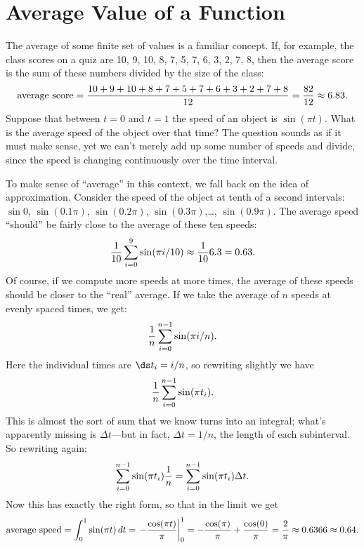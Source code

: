 \section{Average Value of a Function}{}{}\label{sec:Average Value}
The average of some finite set of values is a familiar concept. If,
for example, the class scores on a quiz are 10, 9, 10, 8, 7, 5, 7, 6,
3, 2, 7, 8, then the average score is the sum of these numbers divided
by the size of the class:
$$
  \hbox{average score} = {10+ 9+ 10+ 8+ 7+ 5+ 7+ 6+
  3+ 2+ 7+ 8\over 12}={82\over 12}\approx 6.83.
$$
Suppose that between $t=0$ and $t=1$ the speed of an object is
$\sin(\pi t)$. What is the average speed of the object over that time?
The question sounds as if it must make sense, yet we can't merely add
up some number of speeds and divide, since the speed is changing
continuously over the time interval.

To make sense of ``average'' in this context, we fall back on the idea
of approximation. Consider the speed of the object at tenth of a
second intervals: $\sin 0$, $\sin(0.1\pi)$, $\sin(0.2\pi)$,
$\sin(0.3\pi)$,\dots, $\sin(0.9\pi)$. The average speed ``should'' be
fairly close to the average of these ten speeds:
$$
  {1\over 10}\sum_{i=0}^9 \sin(\pi i/10)\approx {1\over 10}6.3=0.63.
$$
Of course, if we compute more speeds at more times, the average of
these speeds should be closer to the ``real'' average. If we take the
average of $n$ speeds at evenly spaced times, we get:
$${1\over n}\sum_{i=0}^{n-1} \sin(\pi i/n).$$
Here the individual times are $\ds t_i=i/n$, so rewriting slightly we have
$${1\over n}\sum_{i=0}^{n-1} \sin(\pi t_i).$$
This is almost the sort of sum that we know turns into an integral;
what's apparently missing is $\Delta t$---but in fact, $\Delta t=1/n$,
the length of each subinterval. So rewriting again:
$$
  \sum_{i=0}^{n-1} \sin(\pi t_i){1\over n}=
  \sum_{i=0}^{n-1} \sin(\pi t_i)\Delta t.
$$
Now this has exactly the right form, so that in the limit we get
$$
  \hbox{average speed} = \int_0^1 \sin(\pi t)\,dt=
  \left.-{\cos(\pi t)\over\pi}\right|_0^1=
  -{\cos(\pi)\over \pi}+{\cos(0)\over\pi}={2\over\pi}\approx
  0.6366\approx 0.64.
$$

